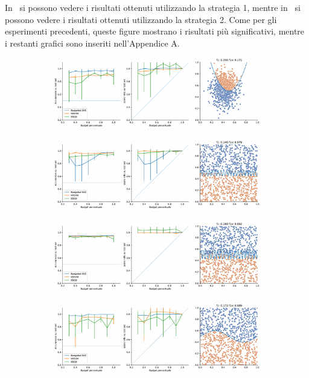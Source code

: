 In~ si possono vedere i risultati ottenuti utilizzando la strategia 1, mentre in~ si possono vedere i risultati ottenuti utilizzando la strategia 2.
Come per gli esperimenti precedenti, queste figure mostrano i risultati più significativi, mentre i restanti grafici sono inseriti nell'Appendice A.
\begin{figure}[b!]
\centering
    \begin{subfigure}{.9\textwidth}
        \centering
        \includegraphics[width=\textwidth]{img/comp_old/3.pdf}
    \end{subfigure}%
    \hfill
    \begin{subfigure}{.9\textwidth}
        \centering
        \includegraphics[width=\textwidth]{img/comp_old/8.pdf}
    \end{subfigure}
    \hfill
    \begin{subfigure}{.9\textwidth}
        \centering
        \includegraphics[width=\textwidth]{img/comp_old/9.pdf}
    \end{subfigure}%
    \hfill
    \begin{subfigure}{.9\textwidth}
        \centering
        \includegraphics[width=\textwidth]{img/comp_old/10.pdf}

\end{subfigure}
\end{figure}
